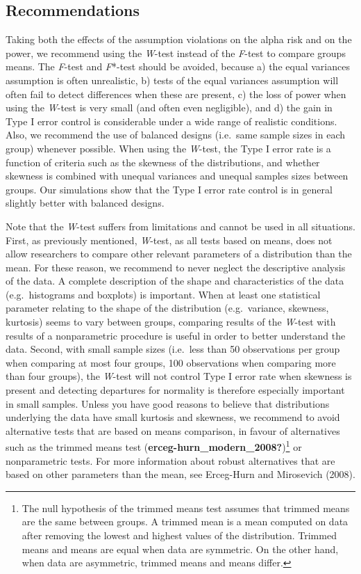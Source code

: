 \documentclass[
  english,
  man]{apa6}
\begin{document}
\hypertarget{recommendations}{%
\subsection{Recommendations}\label{recommendations}}

Taking both the effects of the assumption violations on the alpha risk and on the power, we recommend using the \emph{W}-test instead of the \emph{F}-test to compare groups means. The \emph{F}-test and \emph{F}*-test should be avoided, because a) the equal variances assumption is often unrealistic, b) tests of the equal variances assumption will often fail to detect differences when these are present, c) the loss of power when using the \emph{W}-test is very small (and often even negligible), and d) the gain in Type I error control is considerable under a wide range of realistic conditions. Also, we recommend the use of balanced designs (i.e.~same sample sizes in each group) whenever possible. When using the \emph{W}-test, the Type I error rate is a function of criteria such as the skewness of the distributions, and whether skewness is combined with unequal variances and unequal samples sizes between groups. Our simulations show that the Type I error rate control is in general slightly better with balanced designs.

Note that the \emph{W}-test suffers from limitations and cannot be used in all situations. First, as previously mentioned, \emph{W}-test, as all tests based on means, does not allow researchers to compare other relevant parameters of a distribution than the mean. For these reason, we recommend to never neglect the descriptive analysis of the data. A complete description of the shape and characteristics of the data (e.g.~histograms and boxplots) is important. When at least one statistical parameter relating to the shape of the distribution (e.g.~variance, skewness, kurtosis) seems to vary between groups, comparing results of the \emph{W}-test with results of a nonparametric procedure is useful in order to better understand the data. Second, with small sample sizes (i.e.~less than 50 observations per group when comparing at most four groups, 100 observations when comparing more than four groups), the \emph{W}-test will not control Type I error rate when skewness is present and detecting departures for normality is therefore especially important in small samples. Unless you have good reasons to believe that distributions underlying the data have small kurtosis and skewness, we recommend to avoid alternative tests that are based on means comparison, in favour of alternatives such as the trimmed means test (\textbf{erceg-hurn\_modern\_2008?})\footnote{The null hypothesis of the trimmed means test assumes that trimmed means are the same between groups. A trimmed mean is a mean computed on data after removing the lowest and highest values of the distribution. Trimmed means and means are equal when data are symmetric. On the other hand, when data are asymmetric, trimmed means and means differ.} or nonparametric tests. For more information about robust alternatives that are based on other parameters than the mean, see Erceg-Hurn and Mirosevich (2008).
\end{document}
